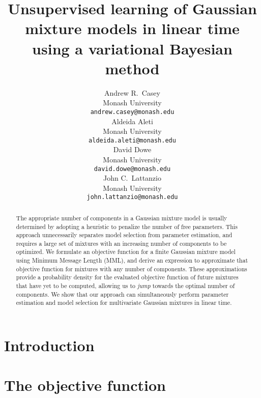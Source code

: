 \documentclass{article}
\title{
  Unsupervised learning of Gaussian mixture models in linear time
  using a variational Bayesian method
}
\author{
  Andrew R.~Casey\\
  Monash University\\
  \texttt{andrew.casey@monash.edu}\\
  \And 
  Aldeida Aleti\\
  Monash University\\
  \texttt{aldeida.aleti@monash.edu}\\
  \AND
  David Dowe\\
  Monash University\\
  \texttt{david.dowe@monash.edu}\\
  \And
  John C.~Lattanzio\\
  Monash University\\
  \texttt{john.lattanzio@monash.edu}\\
}
\begin{document}

\maketitle

\begin{abstract}
  The appropriate number of components in a Gaussian mixture model is usually 
  determined by adopting a heuristic to penalize the number of free parameters.
  This approach unnecessarily separates model selection from parameter estimation,
  and requires a large set of mixtures with an increasing number of components
  to be optimized.
  We formulate an objective function for a finite Gaussian mixture model using
  Minimum Message Length (MML), and derive an expression to approximate that
  objective function for mixtures with any number of components. 
  These approximations provide a probability density for the evaluated objective
  function of future mixtures that have yet to be computed, allowing us to 
  \emph{jump} towards the optimal number of components.
  We show that our approach can simultaneously perform parameter estimation and 
  model selection for multivariate Gaussian mixtures in linear time.
\end{abstract}

\section{Introduction}



\section{The objective function}
\end{document}
